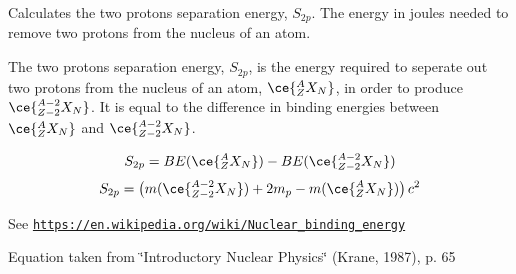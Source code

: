 Calculates the two protons separation energy, $S_{2p}$. The energy in joules needed to remove two protons from the nucleus of an atom. 

The two protons separation energy, $S_{2p}$, is the energy required to seperate out two protons from the nucleus of an atom, $\ce{ ^{A}_{Z}X_{N} }$, in order to produce $\ce{ ^{A-2}_{Z-2}X_{N} }$. It is equal to the difference in binding energies between $\ce{ ^{A}_{Z}X_{N} }$ and $\ce{ ^{A-2}_{Z-2}X_{N} }$.

\[S_{2p} = BE(\ce{ ^{A}_{Z}X_{N} }) - BE(\ce{ ^{A-2}_{Z-2}X_{N} })\] \[S_{2p} = \left ( m(\ce{ ^{A-2}_{Z-2}X_{N} }) + 2 m_p - m(\ce{ ^{A}_{Z}X_{N} }) \right ) c^2\]

See \href{https://en.wikipedia.org/wiki/Nuclear_binding_energy}{\tt https\+://en.\+wikipedia.\+org/wiki/\+Nuclear\+\_\+binding\+\_\+energy}

Equation taken from \char`\"{}\+Introductory Nuclear Physics\char`\"{} (Krane, 1987), p. 65


